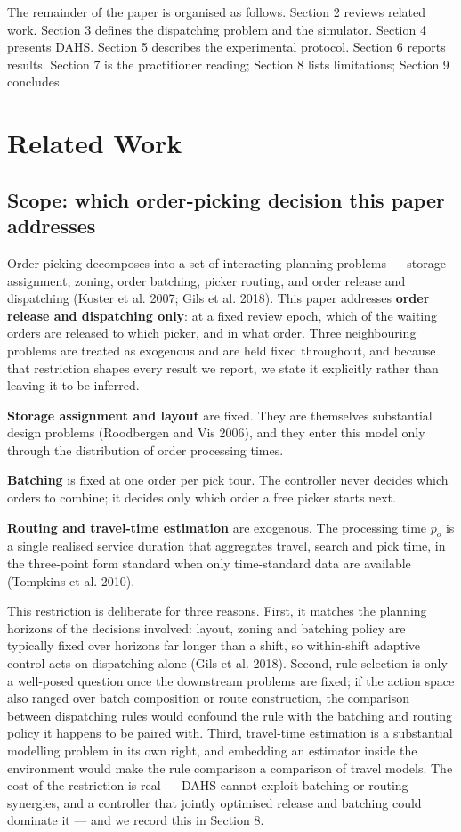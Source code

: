 \documentclass[review,3p,times]{elsarticle}
\theoremstyle{definition}
\begin{document}
The remainder of the paper is organised as follows. Section 2 reviews
related work. Section 3 defines the dispatching problem and the
simulator. Section 4 presents DAHS. Section 5 describes the experimental
protocol. Section 6 reports results. Section 7 is the practitioner
reading; Section 8 lists limitations; Section 9 concludes.

\section{Related Work}\label{related-work}

\subsection{Scope: which order-picking decision this paper
addresses}\label{scope-which-order-picking-decision-this-paper-addresses}

Order picking decomposes into a set of interacting planning problems ---
storage assignment, zoning, order batching, picker routing, and order
release and dispatching (Koster et al. 2007; Gils et al. 2018). This
paper addresses \textbf{order release and dispatching only}: at a fixed
review epoch, which of the waiting orders are released to which picker,
and in what order. Three neighbouring problems are treated as exogenous
and are held fixed throughout, and because that restriction shapes every
result we report, we state it explicitly rather than leaving it to be
inferred.

\textbf{Storage assignment and layout} are fixed. They are themselves
substantial design problems (Roodbergen and Vis 2006), and they enter
this model only through the distribution of order processing times.

\textbf{Batching} is fixed at one order per pick tour. The controller
never decides which orders to combine; it decides only which order a
free picker starts next.

\textbf{Routing and travel-time estimation} are exogenous. The
processing time \(p_o\) is a single realised service duration that
aggregates travel, search and pick time, in the three-point form
standard when only time-standard data are available (Tompkins et al.
2010).

This restriction is deliberate for three reasons. First, it matches the
planning horizons of the decisions involved: layout, zoning and batching
policy are typically fixed over horizons far longer than a shift, so
within-shift adaptive control acts on dispatching alone (Gils et al.
2018). Second, rule selection is only a well-posed question once the
downstream problems are fixed; if the action space also ranged over
batch composition or route construction, the comparison between
dispatching rules would confound the rule with the batching and routing
policy it happens to be paired with. Third, travel-time estimation is a
substantial modelling problem in its own right, and embedding an
estimator inside the environment would make the rule comparison a
comparison of travel models. The cost of the restriction is real ---
DAHS cannot exploit batching or routing synergies, and a controller that
jointly optimised release and batching could dominate it --- and we
record this in Section 8.
\end{document}
